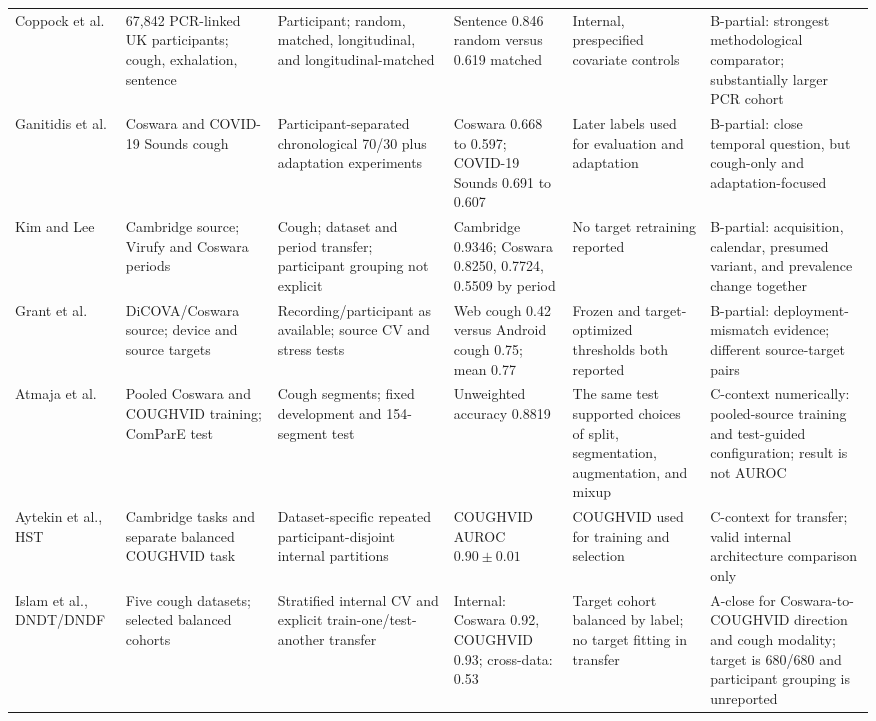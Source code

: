 \begin{longtable}{L{0.15\textwidth}L{0.14\textwidth}L{0.17\textwidth}L{0.12\textwidth}L{0.15\textwidth}L{0.17\textwidth}}
Coppock et al. \cite{coppock2024audio} & 67,842 PCR-linked UK participants; cough, exhalation, sentence & Participant; random, matched, longitudinal, and longitudinal-matched & Sentence 0.846 random versus 0.619 matched & Internal, prespecified covariate controls & B-partial: strongest methodological comparator; substantially larger PCR cohort \\
Ganitidis et al. \cite{ganitidis2025drift} & Coswara and COVID-19 Sounds cough & Participant-separated chronological 70/30 plus adaptation experiments & Coswara 0.668 to 0.597; COVID-19 Sounds 0.691 to 0.607 & Later labels used for evaluation and adaptation & B-partial: close temporal question, but cough-only and adaptation-focused \\
Kim and Lee \cite{kim2024longitudinal} & Cambridge source; Virufy and Coswara periods & Cough; dataset and period transfer; participant grouping not explicit & Cambridge 0.9346; Coswara 0.8250, 0.7724, 0.5509 by period & No target retraining reported & B-partial: acquisition, calendar, presumed variant, and prevalence change together \\
Grant et al. \cite{grant2022deployment} & DiCOVA/Coswara source; device and source targets & Recording/participant as available; source CV and stress tests & Web cough 0.42 versus Android cough 0.75; mean 0.77 & Frozen and target-optimized thresholds both reported & B-partial: deployment-mismatch evidence; different source-target pairs \\
Atmaja et al. \cite{atmaja2025crossdataset} & Pooled Coswara and COUGHVID training; ComParE test & Cough segments; fixed development and 154-segment test & Unweighted accuracy 0.8819 & The same test supported choices of split, segmentation, augmentation, and mixup & C-context numerically: pooled-source training and test-guided configuration; result is not AUROC \\
Aytekin et al., HST \cite{aytekin2024hst} & Cambridge tasks and separate balanced COUGHVID task & Dataset-specific repeated participant-disjoint internal partitions & COUGHVID AUROC $0.90\pm0.01$ & COUGHVID used for training and selection & C-context for transfer; valid internal architecture comparison only \\
Islam et al., DNDT/DNDF \cite{islam2026robust} & Five cough datasets; selected balanced cohorts & Stratified internal CV and explicit train-one/test-another transfer & Internal: Coswara 0.92, COUGHVID 0.93; cross-data: 0.53 & Target cohort balanced by label; no target fitting in transfer & A-close for Coswara-to-COUGHVID direction and cough modality; target is 680/680 and participant grouping is unreported \\

\end{longtable}
